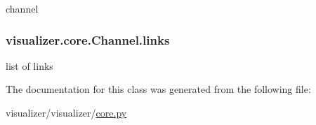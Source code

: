 channel 

\subsubsection[{\texorpdfstring{links}{links}}]{\setlength{\rightskip}{0pt plus 5cm}visualizer.\+core.\+Channel.\+links}\hypertarget{classvisualizer_1_1core_1_1Channel_afc6affc9807a058f1fa442f1e9f77c5c}{}\label{classvisualizer_1_1core_1_1Channel_afc6affc9807a058f1fa442f1e9f77c5c}


list of links 



The documentation for this class was generated from the following file\+:\begin{DoxyCompactItemize}
\item 
visualizer/visualizer/\hyperlink{visualizer_2visualizer_2core_8py}{core.\+py}\end{DoxyCompactItemize}
